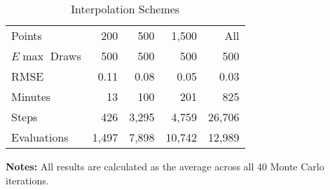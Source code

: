 \begin{table}\onehalfspacing
\begin{center}
\begin{threeparttable}
  \captionsetup{width=30cm}
  \caption{Interpolation Schemes}
  \label{Interpolation Schemes}
  \begin{tabular}{lrrrr}\toprule
  Points      & 200 & 500 & 1,500  & All \\
  $E\max$ Draws & 500 &  500 &   500 & 500 \\
  \midrule
  RMSE        & 0.11 &   0.08 &    0.05 &  0.03  \\
  Minutes     &  13 &      100 &    201 &   825 \\
  Steps       &  426 &   3,295 &    4,759 &  26,706 \\
  Evaluations & 1,497 &   7,898 &    10,742 &  12,989 \\
  \bottomrule
  \end{tabular}\scriptsize
  \begin{tablenotes}\item \textbf{Notes:} All results are calculated as the average across all 40 Monte Carlo iterations.
  \end{tablenotes}
  \end{threeparttable}
  \end{center}
\end{table}
